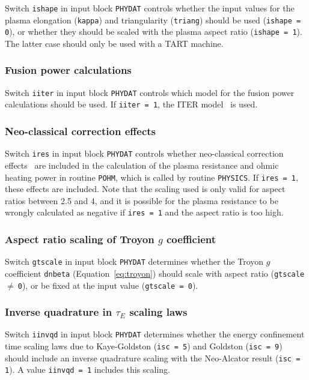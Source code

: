 Switch \texttt{ishape} in input block \texttt{PHYDAT} controls whether the
input values for the plasma elongation (\texttt{kappa}) and triangularity
(\texttt{triang}) should be used (\texttt{ishape = 0}), or whether they should
be scaled with the plasma aspect ratio (\texttt{ishape = 1}). The latter case
should only be used with a TART machine.

\subsubsection{Fusion power calculations}

Switch {\tt iiter} in input block {\tt PHYDAT} controls which model for the
fusion power calculations should be used. If {\tt iiter = 1}, the ITER
model~\cite{IPDG} is used.

\subsubsection{Neo-classical correction effects}

Switch {\tt ires} in input block {\tt PHYDAT} controls whether neo-classical
correction effects~\cite{Uckan} are included in the calculation of the plasma
resistance and ohmic heating power in routine {\tt POHM}, which is called by
routine {\tt PHYSICS}. If {\tt ires = 1}, these effects are included. Note
that the scaling used is only valid for aspect ratios between 2.5 and 4, and
it is possible for the plasma resistance to be wrongly calculated as negative
if {\tt ires = 1} and the aspect ratio is too high.

\subsubsection{Aspect ratio scaling of Troyon $g$ coefficient}

Switch {\tt gtscale} in input block {\tt PHYDAT} determines whether the Troyon
$g$ coefficient {\tt dnbeta} (Equation~\ref{eq:troyon}) should scale with
aspect ratio ({\tt gtscale }$\not=~${\tt 0}), or be fixed at the input value
({\tt gtscale = 0}).

\subsubsection{Inverse quadrature in $\tau_E$ scaling laws}

Switch {\tt iinvqd} in input block {\tt PHYDAT} determines whether the energy
confinement time scaling laws due to Kaye-Goldston ({\tt isc = 5}) and
Goldston ({\tt isc = 9}) should include an inverse quadrature scaling with the
Neo-Alcator result ({\tt isc = 1}). A value {\tt iinvqd = 1} includes this
scaling.

